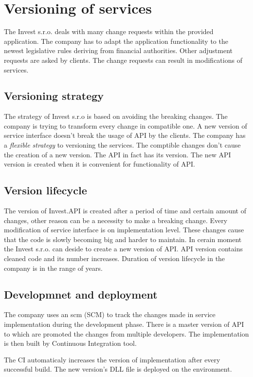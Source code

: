 \section{Versioning of services}
The Invest s.r.o. deals with many change requests within the provided application. The company has to adapt the application functionality to the newest legislative rules deriving from financial authorities. Other adjustment requests are asked by clients. The change requests can result in modifications of services.

\subsection{Versioning strategy}
The strategy of Invest s.r.o is based on avoiding the breaking changes. The company is trying to transform every change in compatible one. A new version of service interface doesn't break the usage of API by the clients. The company has a \emph{flexible strategy} to versioning the services. The comptible changes don't cause the creation of a new version.
The API in fact has its version. The new API version is created when it is convenient for functionality of API.
 

\subsection{Version lifecycle}
The version of Invest.API is created after a period of time and certain amount of changes, other reason can be a necessity to make a breaking change. Every modification of service interface is on implementation level. These changes cause that the code is slowly becoming big and harder to maintain. In cerain moment the Invest s.r.o. can deside to create a new version of API. API version contains cleaned code and its number increases.  Duration of version lifecycle in the company is in the range of years. 
 
\subsection{Developmnet and deployment}
The company uses an \gls{scm} (SCM) to track the changes made in service implementation during the development phase. There is a master version of API to which are promoted the changes from multiple developers. The implementation is then built by Continuous Integration tool. 

The CI automaticaly increases the version of implementation after every successful build. The new version's DLL file is deployed on the environment. 

